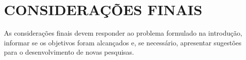 \chapter{CONSIDERAÇÕES FINAIS}
As considerações finais devem responder ao problema formulado na introdução, informar se os objetivos foram alcançados e, se necessário, apresentar sugestões para o desenvolvimento de novas pesquisas.
